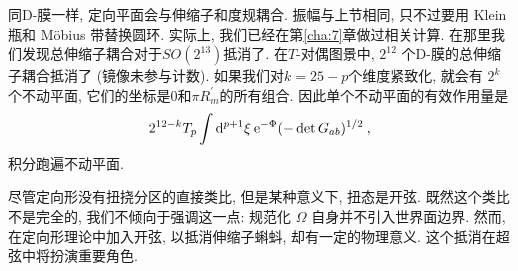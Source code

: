 同D-膜一样, 定向平面会与伸缩子和度规耦合. 振幅与上节相同, 只不过要用 Klein 瓶和 Möbius 带替换圆环. 
实际上, 我们已经在第\ref{cha:7}章做过相关计算. 在那里我们发现总伸缩子耦合对于$S O\left(2^{13}\right)$抵消了. 
在$T$-对偶图景中, $2^{12}$ 个D-膜的总伸缩子耦合抵消了 (镜像未参与计数). 如果我们对$k=25-p$个维度紧致化, 就会有 $2^{k}$个不动平面, 
它们的坐标是0和$\pi R_{m}^{\prime}$的所有组合. 因此单个不动平面的有效作用量是
\begin{equation}
	2^{12-k} T_{p} \int \mathrm{d}^{p+1} \xi \: \mathrm{e}^{-\Phi} (-\operatorname{det} G_{ab})^{1/2} \:, \label{8.8.5}
\end{equation}
积分跑遍不动平面.

尽管定向形没有扭挠分区的直接类比, 但是某种意义下, 扭态是开弦. 既然这个类比不是完全的, 我们不倾向于强调这一点: 
规范化 $\Omega$ 自身并不引入世界面边界. 然而, 在定向形理论中加入开弦, 以抵消伸缩子蝌蚪, 却有一定的物理意义. 这个抵消在超弦中将扮演重要角色.